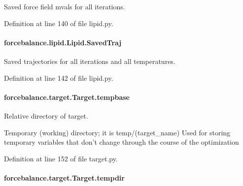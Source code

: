 Saved force field mvals for all iterations. 



Definition at line 140 of file lipid.\-py.

\hypertarget{classforcebalance_1_1lipid_1_1Lipid_a49bef67b40e46c5df608c00d2519b111}{
\paragraph[{Saved\-Traj}]{\setlength{\rightskip}{0pt plus 5cm}forcebalance.\-lipid.\-Lipid.\-Saved\-Traj}}\label{classforcebalance_1_1lipid_1_1Lipid_a49bef67b40e46c5df608c00d2519b111}


Saved trajectories for all iterations and all temperatures. 



Definition at line 142 of file lipid.\-py.

\hypertarget{classforcebalance_1_1target_1_1Target_ae5b544d3e11365865813ef3d626ef81d}{
\paragraph[{tempbase}]{\setlength{\rightskip}{0pt plus 5cm}forcebalance.\-target.\-Target.\-tempbase\hspace{0.3cm}{\ttfamily [inherited]}}}\label{classforcebalance_1_1target_1_1Target_ae5b544d3e11365865813ef3d626ef81d}


Relative directory of target. 

Temporary (working) directory; it is temp/(target\-\_\-name) Used for storing temporary variables that don't change through the course of the optimization 

Definition at line 152 of file target.\-py.

\hypertarget{classforcebalance_1_1target_1_1Target_aa1f01b5b78db253b5b66384ed11ed193}{
\paragraph[{tempdir}]{\setlength{\rightskip}{0pt plus 5cm}forcebalance.\-target.\-Target.\-tempdir\hspace{0.3cm}{\ttfamily [inherited]}}}\label{classforcebalance_1_1target_1_1Target_aa1f01b5b78db253b5b66384ed11ed193}


